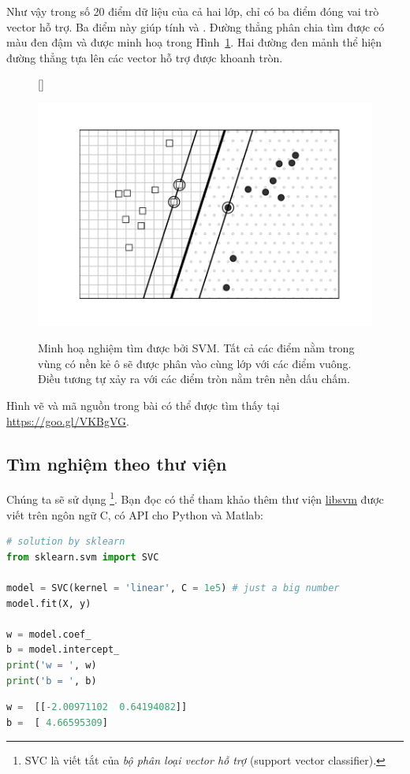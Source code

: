 Như vậy trong số 20 điểm dữ liệu của cả hai lớp, chỉ có ba điểm đóng vai trò  vector hỗ trợ. Ba điểm này giúp tính  và
.
Đường thẳng phân chia tìm được có màu đen đậm và được minh hoạ trong Hình~\ref{fig:svmf5}. Hai đường đen mảnh thể hiện
đường thẳng {tựa} lên các vector hỗ trợ được khoanh tròn.


\begin{figure}[t]
[\FBwidth]
{\caption{
Minh hoạ nghiệm tìm được bởi SVM. Tất cả các điểm nằm trong vùng có nền kẻ ô sẽ được phân vào cùng lớp với các điểm vuông. Điều tương tự xảy
ra với các điểm tròn nằm trên nền dấu chấm.
}
\label{fig:svmf5}}
{ %
\includegraphics[width=.5\textwidth]{ebookML_src/src/svm/svm4.pdf}
}
\end{figure}


Hình vẽ và mã nguồn trong bài có thể được tìm thấy tại \url{https://goo.gl/VKBgVG}.



\subsection{Tìm nghiệm theo thư viện}
Chúng ta sẽ sử dụng \href{http://scikit-learn.org/stable/modules/generated/sklearn.svm.SVC.html}{}\footnote{SVC là viết tắt của \textit{bộ phân loại vector hỗ trợ} (support vector classifier).}. Bạn đọc có thể tham khảo thêm thư viện \href{https://www.csie.ntu.edu.tw/~cjlin/libsvm/}{libsvm} được viết trên ngôn ngữ C, có API cho Python và Matlab:

\begin{lstlisting}[language=Python]
# solution by sklearn
from sklearn.svm import SVC

model = SVC(kernel = 'linear', C = 1e5) # just a big number
model.fit(X, y)

w = model.coef_
b = model.intercept_
print('w = ', w)
print('b = ', b)
\end{lstlisting}
\kq
\begin{lstlisting}[language=Python]
w =  [[-2.00971102  0.64194082]]
b =  [ 4.66595309]
\end{lstlisting}

